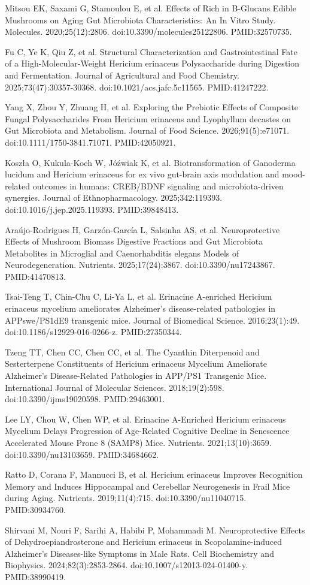 \documentclass[11pt,oneside]{book}
\newcommand{\reff}[2]{\par\hangindent=7mm\hangafter=1\noindent[#1]\hspace{2mm}#2\par}
\begin{document}
\reff{21}{Mitsou EK, Saxami G, Stamoulou E, et al. Effects of Rich in Β-Glucans Edible Mushrooms on Aging Gut Microbiota Characteristics: An In Vitro Study. Molecules. 2020;25(12):2806. doi:10.3390/molecules25122806. PMID:32570735.}
\reff{22}{Fu C, Ye K, Qiu Z, et al. Structural Characterization and Gastrointestinal Fate of a High-Molecular-Weight Hericium erinaceus Polysaccharide during Digestion and Fermentation. Journal of Agricultural and Food Chemistry. 2025;73(47):30357-30368. doi:10.1021/acs.jafc.5c11565. PMID:41247222.}
\reff{23}{Yang X, Zhou Y, Zhuang H, et al. Exploring the Prebiotic Effects of Composite Fungal Polysaccharides From Hericium erinaceus and Lyophyllum decastes on Gut Microbiota and Metabolism. Journal of Food Science. 2026;91(5):e71071. doi:10.1111/1750-3841.71071. PMID:42050921.}
\reff{24}{Koszła O, Kukula-Koch W, Jóźwiak K, et al. Biotransformation of Ganoderma lucidum and Hericium erinaceus for ex vivo gut-brain axis modulation and mood-related outcomes in humans: CREB/BDNF signaling and microbiota-driven synergies. Journal of Ethnopharmacology. 2025;342:119393. doi:10.1016/j.jep.2025.119393. PMID:39848413.}
\reff{25}{Araújo-Rodrigues H, Garzón-García L, Salsinha AS, et al. Neuroprotective Effects of Mushroom Biomass Digestive Fractions and Gut Microbiota Metabolites in Microglial and Caenorhabditis elegans Models of Neurodegeneration. Nutrients. 2025;17(24):3867. doi:10.3390/nu17243867. PMID:41470813.}
\reff{26}{Tsai-Teng T, Chin-Chu C, Li-Ya L, et al. Erinacine A-enriched Hericium erinaceus mycelium ameliorates Alzheimer's disease-related pathologies in APPswe/PS1dE9 transgenic mice. Journal of Biomedical Science. 2016;23(1):49. doi:10.1186/s12929-016-0266-z. PMID:27350344.}
\reff{27}{Tzeng TT, Chen CC, Chen CC, et al. The Cyanthin Diterpenoid and Sesterterpene Constituents of Hericium erinaceus Mycelium Ameliorate Alzheimer's Disease-Related Pathologies in APP/PS1 Transgenic Mice. International Journal of Molecular Sciences. 2018;19(2):598. doi:10.3390/ijms19020598. PMID:29463001.}
\reff{28}{Lee LY, Chou W, Chen WP, et al. Erinacine A-Enriched Hericium erinaceus Mycelium Delays Progression of Age-Related Cognitive Decline in Senescence Accelerated Mouse Prone 8 (SAMP8) Mice. Nutrients. 2021;13(10):3659. doi:10.3390/nu13103659. PMID:34684662.}
\reff{29}{Ratto D, Corana F, Mannucci B, et al. Hericium erinaceus Improves Recognition Memory and Induces Hippocampal and Cerebellar Neurogenesis in Frail Mice during Aging. Nutrients. 2019;11(4):715. doi:10.3390/nu11040715. PMID:30934760.}
\reff{30}{Shirvani M, Nouri F, Sarihi A, Habibi P, Mohammadi M. Neuroprotective Effects of Dehydroepiandrosterone and Hericium erinaceus in Scopolamine-induced Alzheimer's Diseases-like Symptoms in Male Rats. Cell Biochemistry and Biophysics. 2024;82(3):2853-2864. doi:10.1007/s12013-024-01400-y. PMID:38990419.}
\end{document}
